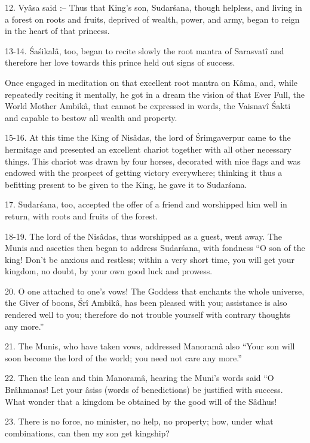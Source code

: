 12. Vy\^asa said :-- Thus that King's son, Sudar\'sana, though helpless, and living in a forest on roots and fruits, deprived of wealth, power, and army, began to reign in the heart of that princess.

13-14. \'Sa\'sikal\^a, too, began to recite slowly the root mantra of Sarasvat\^i and therefore her love towards this prince held out signs of success.

Once engaged in meditation on that excellent root mantra on K\^ama, and, while repeatedly reciting it mentally, he got in a dream the vision of that Ever Full, the World Mother Ambik\^a, that cannot be expressed in words, the Vaisnav\^i \'Sakti and capable to bestow all wealth and property.

15-16. At this time the King of Nis\^adas, the lord of \'Srimgaverpur came to the hermitage and presented an excellent chariot together with all other necessary things. This chariot was drawn by four horses, decorated with nice flags and was endowed with the prospect of getting victory everywhere; thinking it thus a befitting present to be given to the King, he gave it to Sudar\'sana.

17. Sudar\'sana, too, accepted the offer of a friend and worshipped him well in return, with roots and fruits of the forest.

18-19. The lord of the Nis\^adas, thus worshipped as a guest, went away. The Munis and ascetics then began to address Sudar\'sana, with fondness ``O son of the king! Don't be anxious and restless; within a very short time, you will get your kingdom, no doubt, by your own good luck and prowess.

20. O one attached to one's vows! The Goddess that enchants the whole universe, the Giver of boons, \'Sr\^i Ambik\^a, has been pleased with you; assistance is also rendered well to you; therefore do not trouble yourself with contrary thoughts any more.''

21. The Munis, who have taken vows, addressed Manoram\^a also ``Your son will soon become the lord of the world; you need not care any more.''

22. Then the lean and thin Manoram\^a, hearing the Muni's words said ``O Br\^ahmanas! Let your \^asiss (words of benedictions) be justified with success. What wonder that a kingdom be obtained by the good will of the S\^adhus!

23. There is no force, no minister, no help, no property; how, under what combinations, can then my son get kingship?

